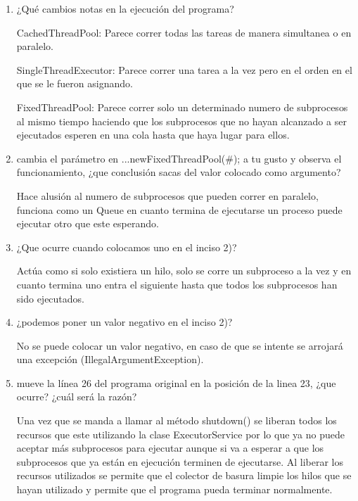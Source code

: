 \documentclass[12pt]{article}
\begin{document}
\begin{enumerate}
\item ¿Qué cambios notas en la ejecución del programa?

  CachedThreadPool: Parece correr todas las tareas de manera
  simultanea o en paralelo.

  SingleThreadExecutor: Parece correr una tarea a la vez pero en el
  orden en el que se le fueron asignando.

  FixedThreadPool: Parece correr solo un determinado numero de
  subprocesos al mismo tiempo haciendo que los subprocesos que no
  hayan alcanzado a ser ejecutados esperen en una cola hasta que haya
  lugar para ellos.

\item cambia el parámetro en ...newFixedThreadPool(\#); a tu gusto y
  observa el funcionamiento, ¿que conclusión sacas del valor colocado
  como argumento?

  Hace alusión al numero de subprocesos que pueden correr en paralelo,
  funciona como un Queue en cuanto termina de ejecutarse un proceso
  puede ejecutar otro que este esperando.

\item ¿Que ocurre cuando colocamos uno en el inciso 2)?

  Actúa como si solo existiera un hilo, solo se corre un subproceso a
  la vez y en cuanto termina uno entra el siguiente hasta que todos
  los subprocesos han sido ejecutados.

\item ¿podemos poner un valor negativo en el inciso 2)?

  No se puede colocar un valor negativo, en caso de que se intente se
  arrojará una excepción (IllegalArgumentException).

\item mueve la línea 26 del programa original en la posición de la
  linea 23, ¿que ocurre?  ¿cuál será la razón?

  Una vez que se manda a llamar al método shutdown() se liberan todos
  los recursos que este utilizando la clase ExecutorService por lo que
  ya no puede aceptar más subprocesos para ejecutar aunque si va a
  esperar a que los subprocesos que ya están en ejecución terminen de
  ejecutarse. Al liberar los recursos utilizados se permite que el
  colector de basura limpie los hilos que se hayan utilizado y permite
  que el programa pueda terminar normalmente.

\end{enumerate}
\end{document}
